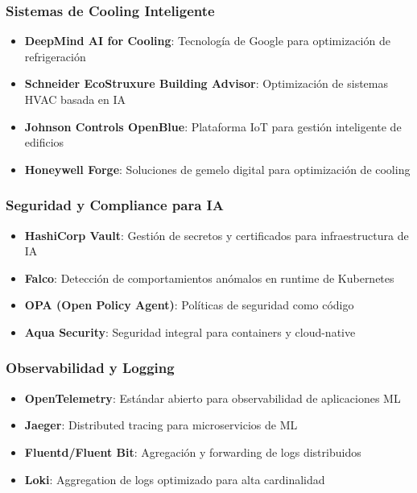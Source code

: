\documentclass[12pt,a4paper]{article}
\begin{document}
\subsubsection{Sistemas de Cooling Inteligente}
\begin{itemize}
    \item \textbf{DeepMind AI for Cooling}: Tecnología de Google para optimización de refrigeración
    \item \textbf{Schneider EcoStruxure Building Advisor}: Optimización de sistemas HVAC basada en IA
    \item \textbf{Johnson Controls OpenBlue}: Plataforma IoT para gestión inteligente de edificios
    \item \textbf{Honeywell Forge}: Soluciones de gemelo digital para optimización de cooling
\end{itemize}

\subsubsection{Seguridad y Compliance para IA}
\begin{itemize}
    \item \textbf{HashiCorp Vault}: Gestión de secretos y certificados para infraestructura de IA
    \item \textbf{Falco}: Detección de comportamientos anómalos en runtime de Kubernetes
    \item \textbf{OPA (Open Policy Agent)}: Políticas de seguridad como código
    \item \textbf{Aqua Security}: Seguridad integral para containers y cloud-native
\end{itemize}

\subsubsection{Observabilidad y Logging}
\begin{itemize}
    \item \textbf{OpenTelemetry}: Estándar abierto para observabilidad de aplicaciones ML
    \item \textbf{Jaeger}: Distributed tracing para microservicios de ML
    \item \textbf{Fluentd/Fluent Bit}: Agregación y forwarding de logs distribuidos
    \item \textbf{Loki}: Aggregation de logs optimizado para alta cardinalidad
\end{itemize}
\end{document}
